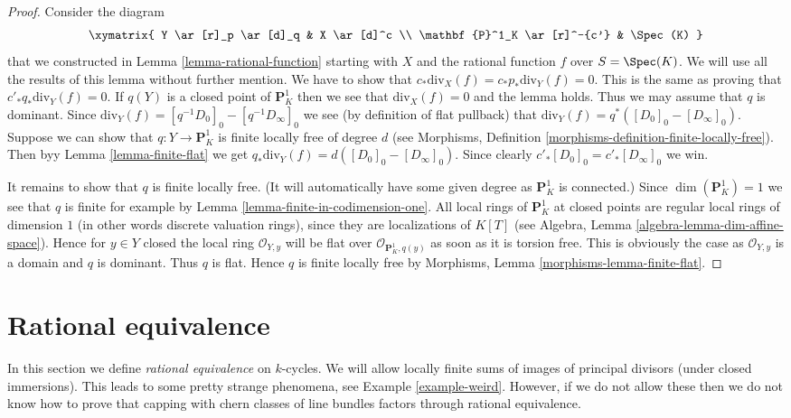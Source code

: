 \begin{proof}
Consider the diagram
$$
\xymatrix{
Y \ar[r]_p \ar[d]_q & X \ar[d]^c \\
\mathbf{P}^1_K \ar[r]^-{c'} & \Spec(K)
}
$$
that we constructed in Lemma \ref{lemma-rational-function}
starting with $X$ and the rational function $f$ over $S = \Spec(K)$.
We will use all the results of this lemma without further mention.
We have to show that $c_*\text{div}_X(f) = c_*p_*\text{div}_Y(f) = 0$.
This is the same as proving that $c'_*q_*\text{div}_Y(f) = 0$.
If $q(Y)$ is a closed point of $\mathbf{P}^1_K$ then we
see that $\text{div}_X(f) = 0$ and the lemma holds.
Thus we may assume that $q$ is dominant.
Since $\text{div}_Y(f) = [q^{-1}D_0]_0 - [q^{-1}D_\infty]_0$
we see (by definition of flat pullback) that
$\text{div}_Y(f) = q^*([D_0]_0 - [D_\infty]_0)$.
Suppose we can show that $q : Y \to \mathbf{P}^1_K$ is finite
locally free of degree $d$ (see
Morphisms, Definition \ref{morphisms-definition-finite-locally-free}).
Then byy Lemma \ref{lemma-finite-flat} we get
$q_*\text{div}_Y(f) = d([D_0]_0 - [D_\infty]_0)$.
Since clearly $c'_*[D_0]_0 = c'_*[D_\infty]_0$ we win.

\medskip\noindent
It remains to show that $q$ is finite locally free.
(It will automatically have some given degree as $\mathbf{P}^1_K$
is connected.)
Since $\dim(\mathbf{P}^1_K) = 1$ we see that $q$ is finite for example
by Lemma \ref{lemma-finite-in-codimension-one}.
All local rings of $\mathbf{P}^1_K$ at
closed points are regular local rings of dimension $1$
(in other words discrete valuation rings), since they are
localizations of $K[T]$ (see
Algebra, Lemma \ref{algebra-lemma-dim-affine-space}).
Hence for $y\in Y$ closed the local ring $\mathcal{O}_{Y, y}$
will be flat over $\mathcal{O}_{\mathbf{P}^1_K, q(y)}$ as soon as
it is torsion free. This is obviously the case as
$\mathcal{O}_{Y, y}$ is a domain and $q$ is dominant.
Thus $q$ is flat. Hence $q$ is finite locally free by
Morphisms, Lemma \ref{morphisms-lemma-finite-flat}.
\end{proof}





\section{Rational equivalence}
\label{section-rational-equivalence}

\noindent
In this section we define {\it rational equivalence} on $k$-cycles.
We will allow locally finite sums of images of
principal divisors (under closed immersions). This leads to some
pretty strange phenomena, see Example \ref{example-weird}.
However, if we do not allow these then we do not know how to prove that
capping with chern classes of line bundles factors through rational
equivalence.

